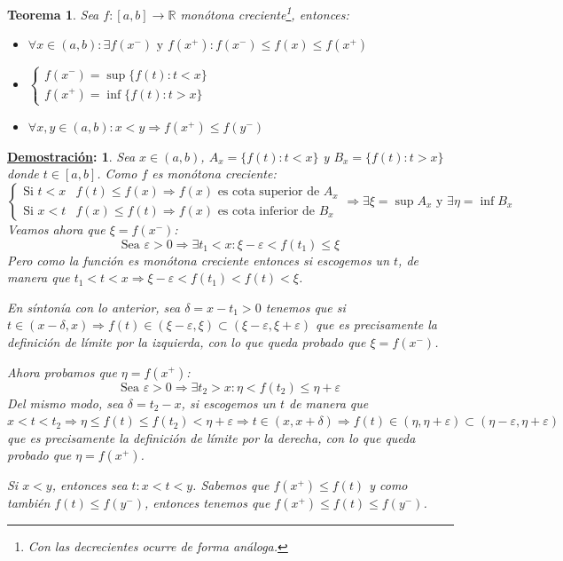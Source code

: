 \documentclass[10pt,a4paper,openright]{book}
\theoremstyle{break}
\newtheorem*{theo}{Teorema}
\newtheorem*{demo}{\underline{Demostración}:}
\begin{document}
\begin{theo}
Sea $f:[a,b]\rightarrow \mathbb R$ monótona creciente\footnote{Con las decrecientes ocurre de forma análoga.}, entonces:
\begin{itemize}
\item $\forall x\in (a,b):\exists f(x^-)\mbox{ y }f(x^+): f(x^-)\leq f(x)\leq f(x^+)$
\item $\begin{cases}f(x^-)=\sup\{f(t): t<x\} \\ f(x^+)=\inf\{f(t): t>x\}\end{cases}$
\item $\forall x,y\in (a,b): x<y\Rightarrow f(x^+)\leq f(y^-)$
\end{itemize}
\end{theo}
\begin{demo}
Sea $x\in (a,b)$, $A_x=\{f(t): t<x\}$ y $B_x=\{f(t): t>x\}$ donde $t\in [a,b]$. Como $f$ es monótona creciente:
$$\begin{cases}\mbox{Si }t< x & f(t)\leq f(x)\Rightarrow f(x)\mbox{ es cota superior de }A_x \\\mbox{Si } x<t & f(x)\leq f(t)\Rightarrow f(x)\mbox{ es cota inferior de }B_x\end{cases}\Rightarrow \exists \xi=\sup A_x\mbox{ y }\exists \eta=\inf B_x$$
Veamos ahora que $\xi=f(x^-)$:
$$\mbox{Sea }\varepsilon>0\Rightarrow \exists t_1<x: \xi-\varepsilon< f(t_1)\leq \xi$$
Pero como la función es monótona creciente entonces si escogemos un $t$, de manera que $t_1<t<x\Rightarrow \xi- \varepsilon<f(t_1)<f(t)<\xi$.

En síntonía con lo anterior, sea $\delta= x-t_1>0$ tenemos que si $t\in (x-\delta, x)\Rightarrow f(t)\in (\xi-\varepsilon, \xi)\subset (\xi-\varepsilon, \xi+ \varepsilon)$ que es precisamente la definición de límite por la izquierda, con lo que queda probado que  $\xi=f(x^-)$.

Ahora probamos que $\eta=f(x^+)$:
$$\mbox{Sea }\varepsilon>0\Rightarrow \exists t_2>x: \eta< f(t_2)\leq \eta+ \varepsilon$$
Del mismo modo, sea $\delta= t_2-x$, si escogemos un $t$ de manera que $x<t<t_2\Rightarrow \eta\leq f(t)\leq f(t_2)<\eta+ \varepsilon \Rightarrow t\in (x, x+\delta)\Rightarrow f(t)\in (\eta, \eta+\varepsilon)\subset (\eta-\varepsilon, \eta+ \varepsilon)$ que es precisamente la definición de límite por la derecha, con lo que queda probado que  $\eta=f(x^+)$.

Si $x<y$, entonces sea $t: x<t<y$. Sabemos que $f(x^+)\leq f(t)$ y como también $f(t)\leq f(y^-)$, entonces tenemos que $f(x^+)\leq f(t)\leq f(y^-)$.
\end{demo}
\end{document}
